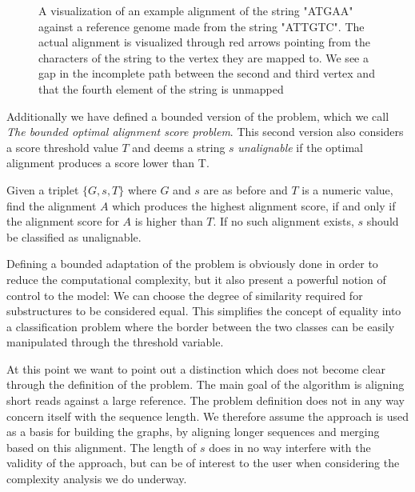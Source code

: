 \documentclass[thesis.tex]{subfiles}
\begin{document}
{\begin{figure}[H]
\begin{mdframed}
\begin{center}
    \end{center}
  \end{mdframed}
  \caption{A visualization of an example alignment of the string "ATGAA" against a reference genome made from the string "ATTGTC". The actual alignment is visualized through red arrows pointing from the characters of the string to the vertex they are mapped to. We see a gap in the incomplete path between the second and third vertex and that the fourth element of the string is unmapped}
\end{figure}
\clearpage\noindent
Additionally we have defined a bounded version of the problem, which we call \textit{The bounded optimal alignment score problem}. This second version also considers a score threshold value $T$ and deems a string $s$ \textit{unalignable} if the optimal alignment produces a score lower than T.
\begin{defn}
  \label{def:bounded_alignment_problem}
  Given a triplet $\{G, s, T\}$ where $G$ and $s$ are as before and $T$ is a numeric value, find the alignment $A$ which produces the highest alignment score, if and only if the alignment score for $A$ is higher than $T$. If no such alignment exists, $s$ should be classified as unalignable.
\end{defn}
Defining a bounded adaptation of the problem is obviously done in order to reduce the computational complexity, but it also present a powerful notion of control to the model: We can choose the degree of similarity required for substructures to be considered equal. This simplifies the concept of equality into a classification problem where the border between the two classes can be easily manipulated through the threshold variable.\\
\par\noindent
At this point we want to point out a distinction which does not become clear through the definition of the problem. The main goal of the algorithm is aligning short reads against a large reference. The problem definition does not in any way concern itself with the sequence length. We therefore assume the approach is used as a basis for building the graphs, by aligning longer sequences and merging based on this alignment. The length of $s$ does in no way interfere with the validity of the approach, but can be of interest to the user when considering the complexity analysis we do underway.
}
\clearpage
\end{document}
